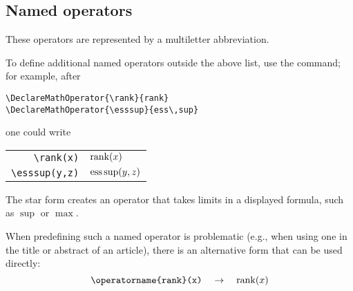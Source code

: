 \subsection{Named operators}
These operators are represented by a multiletter abbreviation.
\begin{symlist}[adjustcols=-1]
  \end{symlist}

To define additional named operators outside the above list, use the
 command; for example, after
\begin{verbatim}
\DeclareMathOperator{\rank}{rank}
\DeclareMathOperator{\esssup}{ess\,sup}
\end{verbatim}
one could write
\begin{center}
\begin{tabular}{rl}
\verb'\rank(x)'& $\rank(x)$\\
\verb'\esssup(y,z)'& $\esssup(y,z)$
\end{tabular}
\end{center}
The star form  creates an operator that takes
limits in a displayed formula, such as $\sup$ or $\max$.

When predefining such a named operator is problematic (e.g., when using
one in the title or abstract of an article), there is an alternative
form that can be used directly:
\[\verb'\operatorname{rank}(x)'\quad
  \rightarrow\quad\operatorname{rank}(x)\]

